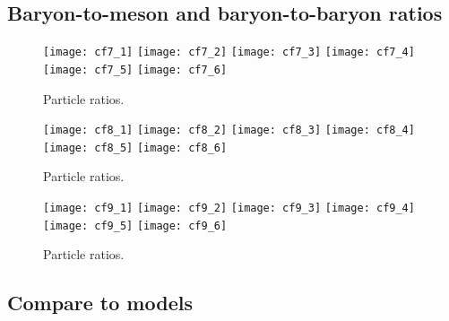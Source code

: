 \subsection{Baryon-to-meson and baryon-to-baryon ratios}
\label{subsec:ParRatios}
\begin{figure}[!ht]
	\begin{center}
		\texttt{[image: cf7\_1]}
		\texttt{[image: cf7\_2]}
		\texttt{[image: cf7\_3]}
		\texttt{[image: cf7\_4]}
		\texttt{[image: cf7\_5]}
		\texttt{[image: cf7\_6]}
	\end{center}
	\caption{Particle ratios.}
	\label{fig:ppRatio}
\end{figure}
\begin{figure}[!ht]
	\begin{center}
		\texttt{[image: cf8\_1]}
		\texttt{[image: cf8\_2]}
		\texttt{[image: cf8\_3]}
		\texttt{[image: cf8\_4]}
		\texttt{[image: cf8\_5]}
		\texttt{[image: cf8\_6]}
	\end{center}
	\caption{Particle ratios.}
	\label{fig:pPbRatio}
\end{figure}
\begin{figure}[!ht]
	\begin{center}
		\texttt{[image: cf9\_1]}
		\texttt{[image: cf9\_2]}
		\texttt{[image: cf9\_3]}
		\texttt{[image: cf9\_4]}
		\texttt{[image: cf9\_5]}
		\texttt{[image: cf9\_6]}
	\end{center}
	\caption{Particle ratios.}
	\label{fig:pppPbRatio}
\end{figure}

\subsection{Compare to models}
\label{subsec:ComToMod}
